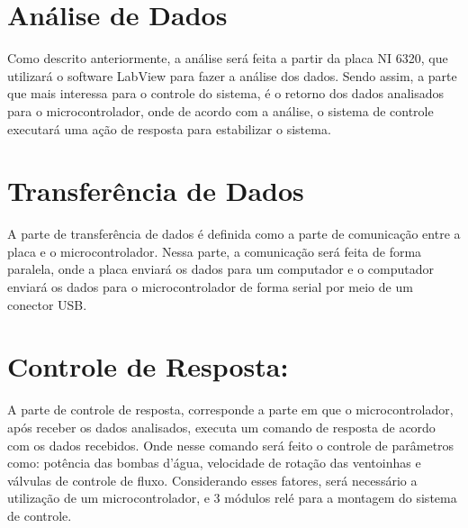 \section{Análise de Dados}
Como descrito anteriormente, a análise será feita a partir da placa NI 6320, que utilizará o software LabView para fazer a análise dos dados. Sendo assim, a parte que mais interessa para o controle do sistema, é o retorno dos dados analisados para o microcontrolador, onde de acordo com a análise, o sistema de controle executará uma ação de resposta para estabilizar o sistema.
\section{Transferência de Dados}
A parte de transferência de dados é definida como a parte de comunicação entre a placa e o microcontrolador. Nessa parte, a comunicação será feita de forma paralela, onde a placa enviará os dados para um computador e o computador enviará os dados para o microcontrolador de forma serial por meio de um conector USB.
\section{Controle de Resposta:}
A parte de controle de resposta, corresponde a parte em que o microcontrolador, após receber os dados analisados, executa um comando de resposta de acordo com os dados recebidos. Onde nesse comando será feito o controle de parâmetros como: potência das bombas d'água, velocidade de rotação das ventoinhas e válvulas de controle de fluxo.
Considerando esses fatores, será necessário a utilização de um microcontrolador, e 3 módulos relé para a montagem do sistema de controle.

